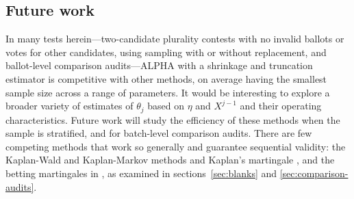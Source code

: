 \documentclass[12pt,runningheads]{llncs}
\begin{document}
{\subsection{Future work}
In many tests herein---two-candidate plurality contests with no invalid ballots or votes for other candidates, using
sampling with or without replacement, and ballot-level comparison audits---ALPHA with a shrinkage and truncation 
estimator is competitive with other methods, on average having the smallest sample size across a range of parameters.
It would be interesting
to explore a broader variety of estimates of $\theta_j$ based on $\eta$ and $X^{j-1}$ and their operating characteristics.
Future work will study the efficiency of these methods when the sample is stratified, and for batch-level comparison audits.
There are few competing methods that work so generally and guarantee sequential validity: the 
Kaplan-Wald and Kaplan-Markov methods and Kaplan's martingale \cite{stark09a,stark20},
and the betting martingales in \cite{waudby-smithEtal21}, as examined in sections~\ref{sec:blanks} and \ref{sec:comparison-audits}.

}
\end{document}
